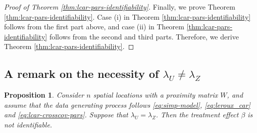 \documentclass[11pt]{article}
\newtheorem{proposition}{Proposition}
\theoremstyle{definition}
\theoremstyle{remark}
\begin{document}
\begin{proof}[Proof of Theorem \ref{thm:lcar-pars-identifiability}]
Finally, we prove Theorem \ref{thm:lcar-pars-identifiability}. 
Case (i) in Theorem \ref{thm:lcar-pars-identifiability} follows from the first part above, 
and case (ii) in Theorem \ref{thm:lcar-pars-identifiability} follows from the second and third parts. 
Therefore, we derive Theorem \ref{thm:lcar-pars-identifiability}. 
\end{proof}

\subsection{A remark on the necessity of $\lambda_{U} \neq \lambda_Z$} 

\begin{proposition}\label{prop:lcar-pars-lambdaU-lambdaZ-equal}
Consider $n$ spatial locations with a proximity matrix $W$, and assume that the data generating process follows \eqref{eq:simp-model}, \eqref{eq:leroux_car} and \eqref{eq:lcar-crosscov-pars}. Suppose that $\lambda_U=\lambda_Z$. 
Then the treatment effect $\beta$ is not identifiable.
\end{proposition}
\end{document}
